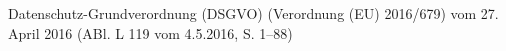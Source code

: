 %
%
%
%
\addchap{\chapHeadingLOR}

\vspace{\baselineskip}
Datenschutz-Grundverordnung (DSGVO) (Verordnung (EU) 2016/679) vom 27. April 2016 (ABl. L 119 vom 4.5.2016, S. 1–88)

